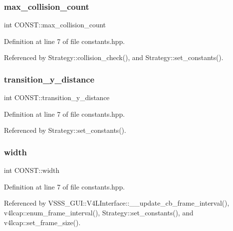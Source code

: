 \subsubsection{\texorpdfstring{max\+\_\+collision\+\_\+count}{max\_collision\_count}}
{\footnotesize\ttfamily int C\+O\+N\+S\+T\+::max\+\_\+collision\+\_\+count\hspace{0.3cm}{\ttfamily [static]}}



Definition at line 7 of file constants.\+hpp.



Referenced by Strategy\+::collision\+\_\+check(), and Strategy\+::set\+\_\+constants().

\mbox{\label{namespace_c_o_n_s_t_a80cf517751f39b73463d8dbe63458266}} 
\subsubsection{\texorpdfstring{transition\+\_\+y\+\_\+distance}{transition\_y\_distance}}
{\footnotesize\ttfamily int C\+O\+N\+S\+T\+::transition\+\_\+y\+\_\+distance\hspace{0.3cm}{\ttfamily [static]}}



Definition at line 7 of file constants.\+hpp.



Referenced by Strategy\+::set\+\_\+constants().

\mbox{\label{namespace_c_o_n_s_t_afd10469262c8cf9aec66ca799bfea24c}} 
\subsubsection{\texorpdfstring{width}{width}}
{\footnotesize\ttfamily int C\+O\+N\+S\+T\+::width\hspace{0.3cm}{\ttfamily [static]}}



Definition at line 7 of file constants.\+hpp.



Referenced by V\+S\+S\+S\+\_\+\+G\+U\+I\+::\+V4\+L\+Interface\+::\+\_\+\+\_\+update\+\_\+cb\+\_\+frame\+\_\+interval(), v4lcap\+::enum\+\_\+frame\+\_\+interval(), Strategy\+::set\+\_\+constants(), and v4lcap\+::set\+\_\+frame\+\_\+size().

